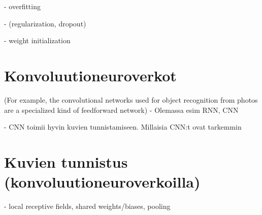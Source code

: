 \documentclass[11pt]{article}
\theoremstyle{plain}
\theoremstyle{definition}
\begin{document}
  - overfitting

  - (regularization, dropout)

  - weight initialization

  \section{Konvoluutioneuroverkot}
   (For example, the convolutional networks used for object recognition from photos are a specialized kind of feedforward network)
  - Olemassa esim RNN, CNN

  - CNN toimii hyvin kuvien tunnistamiseen. Millaisia CNN:t ovat tarkemmin
  \section{Kuvien tunnistus (konvoluutioneuroverkoilla)}
  - local receptive fields, shared weights/biases, pooling

  \renewcommand{\refname}{Lähteet}
  
  

  
\end{document}

